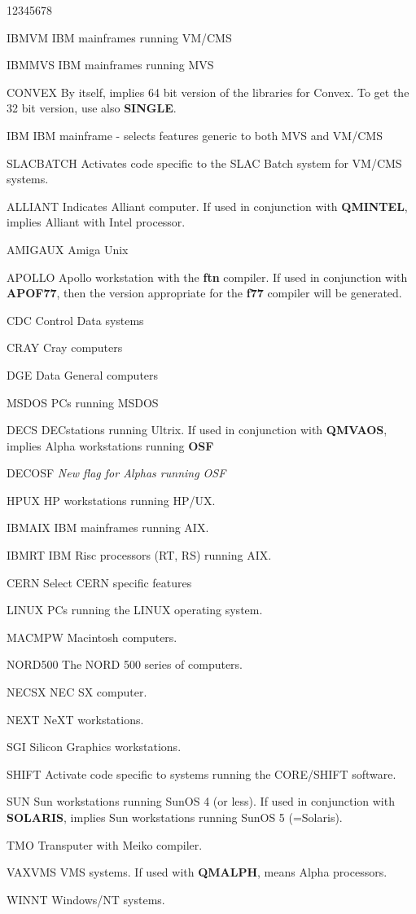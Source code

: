 \begin{DLtt}{12345678}
\item[IBMVM]IBM mainframes running VM/CMS
\item[IBMMVS]IBM mainframes running MVS
\item[CONVEX]By itself, implies 64 bit version of the libraries for Convex.
To get the 32 bit version, use also {\bf SINGLE}.
\item[IBM]IBM mainframe - selects features generic to both MVS and VM/CMS
\item[SLACBATCH]Activates code specific to the SLAC Batch system for VM/CMS
systems.
\item[ALLIANT]Indicates Alliant computer. If used in conjunction with
{\bf QMINTEL}, implies Alliant with Intel processor.
\item[AMIGAUX]Amiga Unix
\item[APOLLO]Apollo workstation with the {\bf ftn} compiler. If used in 
conjunction with {\bf APOF77}, then the version appropriate for the {\bf f77}
compiler will be generated.
\item[CDC]Control Data systems
\item[CRAY]Cray computers
\item[DGE]Data General computers
\item[MSDOS]PCs running MSDOS
\item[DECS]DECstations running Ultrix. If used in conjunction with
{\bf QMVAOS}, implies Alpha workstations running {\bf OSF}
\item[DECOSF]{\it New flag for Alphas running OSF}
\item[HPUX]HP workstations running HP/UX.
\item[IBMAIX]IBM mainframes running AIX.
\item[IBMRT]IBM Risc processors (RT, RS) running AIX.
\item[CERN]Select CERN specific features
\item[LINUX]PCs running the LINUX operating system.
\item[MACMPW]Macintosh computers.
\item[NORD500]The NORD 500 series of computers.
\item[NECSX]NEC SX computer.
\item[NEXT]NeXT workstations.
\item[SGI]Silicon Graphics workstations.
\item[SHIFT]Activate code specific to systems running the CORE/SHIFT software.
\item[SUN]Sun workstations running SunOS 4 (or less). If used in conjunction
with {\bf SOLARIS}, implies
Sun workstations running SunOS 5 (=Solaris).

\item[TMO]Transputer with Meiko compiler.

\item[VAXVMS]VMS systems. If used with {\bf QMALPH}, means Alpha processors.

\item[WINNT]Windows/NT systems.
\end{DLtt}


